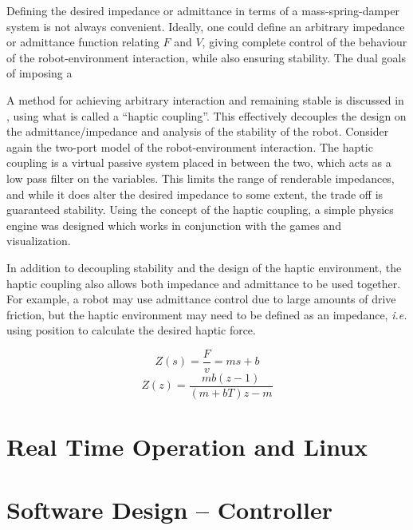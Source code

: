 \documentclass[12pt]{report}
\begin{document}
Defining the desired impedance or admittance in terms of a mass-spring-damper system is not always convenient. Ideally, one could define an arbitrary impedance or admittance function relating $F$ and $V$, giving complete control of the behaviour of the robot-environment interaction, while also ensuring stability. The dual goals of imposing a 
	
	A method for achieving arbitrary interaction and remaining stable is discussed in \cite{Adams1999}, using what is called a ``haptic coupling''. This effectively decouples the design on the admittance/impedance and analysis of the stability of the robot. Consider again the two-port model of the robot-environment interaction. The haptic coupling is a virtual passive system placed in between the two, which acts as a low pass filter on the variables. This limits the range of renderable impedances, and while it does alter the desired impedance to some extent, the trade off is guaranteed stability. Using the concept of the haptic coupling, a simple physics engine was designed which works in conjunction with the games and visualization. 
	
	In addition to decoupling stability and the design of the haptic environment, the haptic coupling also allows both impedance and admittance to be used together. For example, a robot may use admittance control due to large amounts of drive friction, but the haptic environment may need to be defined as an impedance, \textit{i.e.} using position to calculate the desired haptic force. 
	
	\begin{equation}
		Z(s) = \frac{F}{v} = ms + b  
	\end{equation}
	\begin{equation}
		Z(z) = \frac{mb(z-1)}{(m+bT)z - m}
	\end{equation}
		
	\section{Real Time Operation and Linux}
	
%

		
	\section{Software Design -- Controller}
\end{document}

